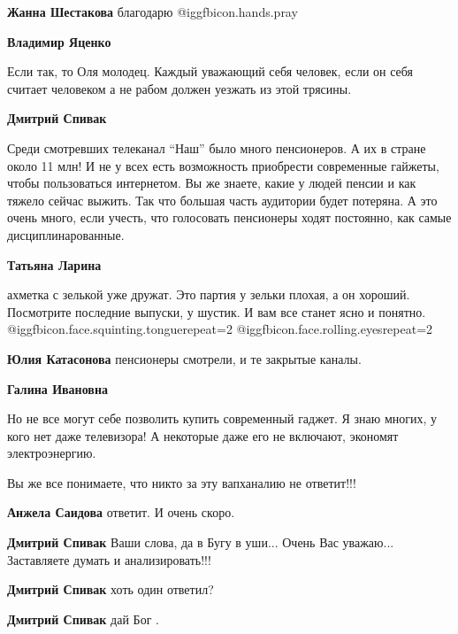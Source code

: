\begin{itemize}
\begin{itemize}
\textbf{Жанна Шестакова} благодарю  @igg{fbicon.hands.pray} 

\textbf{Владимир Яценко} 

Если так, то Оля молодец. Каждый уважающий себя человек, если он себя считает
человеком а не рабом должен уезжать из этой трясины.

\textbf{Дмитрий Спивак} 

Среди смотревших телеканал \enquote{Наш} было много пенсионеров. А их в стране около 11
млн! И не у всех есть возможность приобрести современные гайжеты, чтобы
пользоваться интернетом. Вы же знаете, какие у людей пенсии и как тяжело сейчас
выжить. Так что большая часть аудитории будет потеряна. А это очень много, если
учесть, что голосовать пенсионеры ходят постоянно, как самые дисциплинарованные.

\textbf{Татьяна Ларина} 

ахметка с зелькой уже дружат. Это партия у зельки плохая, а он хороший.
Посмотрите последние выпуски, у шустик. И вам все станет ясно и понятно.
 @igg{fbicon.face.squinting.tongue}{repeat=2}  @igg{fbicon.face.rolling.eyes}{repeat=2} 

\textbf{Юлия Катасонова} пенсионеры смотрели, и те закрытые каналы.

\textbf{Галина Ивановна} 

Но не все могут себе позволить купить современный гаджет. Я знаю многих, у кого
нет даже телевизора! А некоторые даже его не включают, экономят электроэнергию.

\end{itemize} %


Вы же все понимаете, что никто за эту вапханалию не ответит!!!

\begin{itemize} %
\textbf{Анжела Саидова} ответит. И очень скоро.

\textbf{Дмитрий Спивак} Ваши слова, да в Бугу в уши... Очень Вас уважаю... Заставляете думать и анализировать!!!

\textbf{Дмитрий Спивак} хоть один ответил?

\textbf{Дмитрий Спивак} дай Бог .
\end{itemize} %



\end{itemize}
